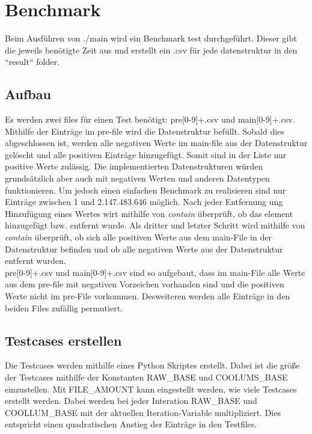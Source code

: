\section{Benchmark}
Beim Ausführen von ./main wird ein Benchmark test durchgeführt. Dieser gibt die jeweils benötigte Zeit aus und erstellt ein .csv für jede datenstruktur
in den “result“ folder. 

\subsection{Aufbau}
\label{bench:aufbau}
Es werden zwei files für einen Test benötigt: pre[0-9]+.csv und main[0-9]+.csv. Mithilfe der Einträge im pre-file wird die
Datenstruktur befüllt. Sobald dies abgeschlossen ist, werden alle negativen Werte im main-file aus der Datenstruktur gelöscht 
und alle positiven Einträge hinzugefügt. Somit sind in der Liste nur positive Werte zulässig. Die implementierten Datenstrukturen
würden grundsätzlich aber auch mit negativen Werten und anderen Datentypen funktionieren. Um jedoch einen einfachen 
Benchmark zu realisieren sind nur Einträge zwischen 1 und 2.147.483.646 möglich. 
Nach jeder Entfernung ung Hinzufügung eines Wertes wirt mithilfe von \textit{contain} überprüft, ob das element hinzugefügt bzw.
entfernt wurde. 
Als dritter und letzter Schritt wird mithilfe von \textit{contain} überprüft, ob sich alle positiven Werte aus dem main-File 
in der Datenstruktur befinden und ob alle negativen Werte aus der Datenstruktur entfernt wurden. 
\\
pre[0-9]+.csv und main[0-9]+.csv sind so aufgebaut, dass im main-File alle Werte aus dem pre-file mit negativen Vorzeichen
vorhanden sind und die positiven Werte nicht im pre-File vorkommen. Desweiteren werden alle Einträge in den beiden Files
zufällig permutiert. 

\subsection{Testcases erstellen}
Die Testcases werden mithilfe eines Python Skriptes erstellt. Dabei ist die größe der Testcases mithilfe der Konstanten
RAW\_BASE und COOLUMS\_BASE einzustellen. Mit FILE\_AMOUNT kann eingestellt werden, wie viele Testcases erstellt werden.
Dabei werden bei jeder Interation RAW\_BASE und COOLLUM\_BASE mit der aktuellen Iteration-Variable multipliziert.
Dies entspricht einen quadratischen Anstieg der Einträge in den Testfiles.   


